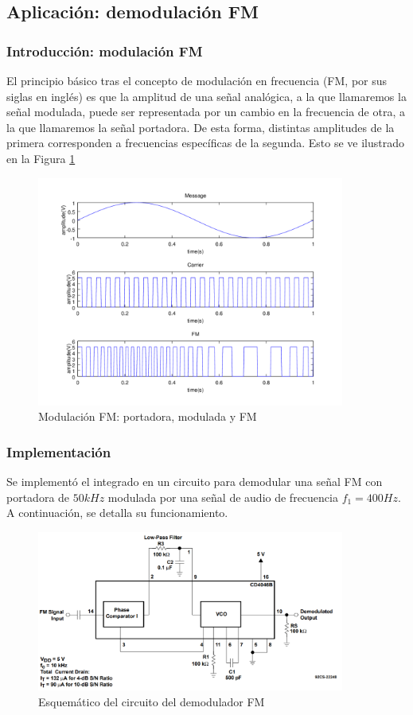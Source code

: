 \documentclass{article}
\begin{document}
\subsection{Aplicación: demodulación FM}
\subsubsection{Introducción: modulación FM}
El principio básico tras el concepto de modulación en frecuencia (FM, por sus siglas en inglés) es que la amplitud de una señal analógica, a la que llamaremos la señal modulada, puede ser representada por un cambio en la frecuencia de otra, a la que llamaremos la señal portadora. De esta forma, distintas amplitudes de la primera corresponden a frecuencias específicas de la segunda. Esto se ve ilustrado en la Figura \ref{modulacionfmsenales}
\begin{figure}[H]
    \centering
    \includegraphics[width=0.9\textwidth]{resources/modulacionfmsenales.png}
    \caption{Modulación FM: portadora, modulada y FM}
    \label{modulacionfmsenales}
\end{figure}

\subsubsection{Implementación}
Se implementó el integrado en un circuito para demodular una señal FM con portadora de $50kHz$ modulada por una señal de audio de frecuencia $f_{1}=400Hz$. A continuación, se detalla su funcionamiento.
\begin{figure}[H]
    \centering
    \includegraphics[width=0.9\textwidth]{resources/demoduladorfmconexion.png}
    \caption{Esquemático del circuito del demodulador FM}
    \label{demoduladorfmconexion}
\end{figure}
\end{document}
